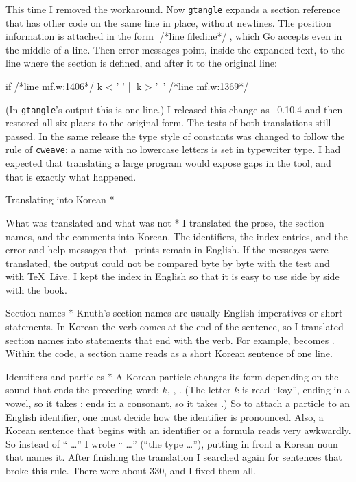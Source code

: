 This time I removed the workaround. Now {\tt gtangle} expands a section
reference that has other code on the same line in place, without
newlines. The position information is attached in the form
|/*line file:line*/|, which Go accepts even in the middle of a line.
Then error messages point, inside the expanded text, to the line where
the section is defined, and after it to the original line:

\verbatim
if /*line mf.w:1406*/ k < ' ' ||
   k > '~' /*line mf.w:1369*/ {
\endverbatim

\noindent (In {\tt gtangle}'s output this is one line.) I released this
change as \GWEB\ 0.10.4 and then restored all six places to the
original form. The tests of both translations still passed. In the same
release the type style of constants was changed to follow the rule of
{\tt cweave}: a name with no lowercase letters is set in typewriter
type. I had expected that translating a large program would expose gaps
in the tool, and that is exactly what happened.

\quad Translating into Korean *

\subhead * What was translated and what was not *
I translated the prose, the section names, and the comments into
Korean. The identifiers, the index entries, and the error and help
messages that \MF\ prints remain in English. If the messages were
translated, the output could not be compared byte by byte with the
 test and with \TeX\ Live. I kept the index in English so
that it is easy to use side by side with the book.

\subhead * Section names *
Knuth's section names are usually English imperatives or short
statements. In Korean the verb comes at the end of the sentence, so I
translated section names into statements that end with the verb. For
example,  becomes
. Within the code, a section
name reads as a short Korean sentence of one line.

\subhead * Identifiers and particles *
A Korean particle changes its form depending on the sound that ends
the preceding word: $k$, ,
. (The letter $k$ is read ``kay'', ending in a
vowel, so it takes ;  ends in a consonant, so it
takes .) So to attach a particle to an English identifier, one
must decide how the identifier is pronounced. Also, a Korean sentence
that begins with an identifier or a formula reads very awkwardly. So
instead of `` \dots'' I wrote ``
 \dots'' (``the type  \dots''),
putting in front a Korean noun that names it. After finishing the
translation I searched again for sentences that broke this rule. There
were about 330, and I fixed them all.

}
